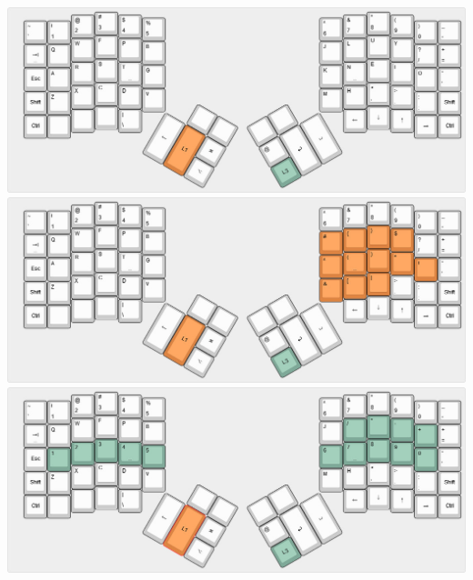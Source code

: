 \documentclass{article}
\begin{document}
\begin{center}
\includegraphics[scale=0.5]{keyboard-layout-00.jpg}
\includegraphics[scale=0.5]{keyboard-layout-01.jpg}
\includegraphics[scale=0.5]{keyboard-layout-03.jpg}
\end{center}
\end{document}
